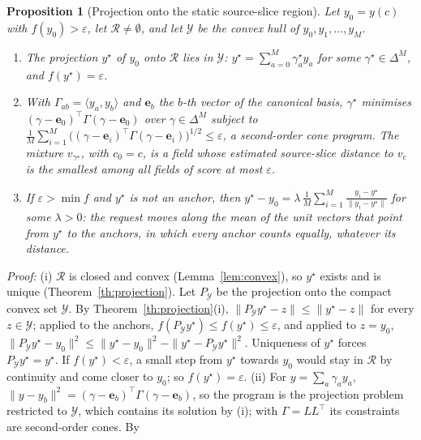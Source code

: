 \documentclass{article}
\theoremstyle{plain}
\newtheorem{proposition}[theorem]{Proposition}
\theoremstyle{remark}
\begin{document}
\begin{proposition}[Projection onto the static source-slice region]\label{pr:slice_projection}
Let $y_0=y(c)$ with $f(y_0)>\varepsilon$, let $\mathcal R\ne\emptyset$, and let $\mathcal Y$ be the convex hull of $y_0,y_1,\dots,y_M$.
\begin{enumerate}[label=(\roman*)]
\item The projection $y^\star$ of $y_0$ onto $\mathcal R$ lies in $\mathcal Y$: $y^\star=\sum_{a=0}^M\gamma^\star_ay_a$ for some $\gamma^\star\in\Delta^M$,
and $f(y^\star)=\varepsilon$.
\item With $\Gamma_{ab}=\langle y_a,y_b\rangle$ and $\mathbf e_b$ the $b$-th vector of the canonical basis, $\gamma^\star$ minimises
$(\gamma-\mathbf e_0)^\top\Gamma(\gamma-\mathbf e_0)$ over $\gamma\in\Delta^M$ subject to
$\frac1M\sum_{i=1}^M\big((\gamma-\mathbf e_i)^\top\Gamma(\gamma-\mathbf e_i)\big)^{1/2}\le\varepsilon$, a second-order cone program. The mixture
$v_{\gamma^\star}$, with $c_0=c$, is a field whose estimated source-slice distance to $v_c$ is the smallest among all fields of score at
most $\varepsilon$.
\item If $\varepsilon>\min f$ and $y^\star$ is not an anchor, then
$y^\star-y_0=\lambda\,\frac1M\sum_{i=1}^M\frac{y_i-y^\star}{\|y_i-y^\star\|}$ for some $\lambda>0$: the request moves along the mean of the
unit vectors that point from $y^\star$ to the anchors, in which every anchor counts equally, whatever its distance.
\end{enumerate}
\end{proposition}
\textit{Proof:}
(i) $\mathcal R$ is closed and convex (Lemma~\ref{lem:convex}), so $y^\star$ exists and is unique (Theorem~\ref{th:projection}). Let $P_{\mathcal Y}$ be the
projection onto the compact convex set $\mathcal Y$. By Theorem~\ref{th:projection}(i), $\|P_{\mathcal Y}y^\star-z\|\le\|y^\star-z\|$ for every
$z\in\mathcal Y$; applied to the anchors, $f(P_{\mathcal Y}y^\star)\le f(y^\star)\le\varepsilon$, and applied to $z=y_0$,
$\|P_{\mathcal Y}y^\star-y_0\|^2\le\|y^\star-y_0\|^2-\|y^\star-P_{\mathcal Y}y^\star\|^2$. Uniqueness of $y^\star$ forces $P_{\mathcal Y}y^\star=y^\star$. If
$f(y^\star)<\varepsilon$, a small step from $y^\star$ towards $y_0$ would stay in $\mathcal R$ by continuity and come closer to $y_0$; so
$f(y^\star)=\varepsilon$.
(ii) For $y=\sum_a\gamma_ay_a$, $\|y-y_b\|^2=(\gamma-\mathbf e_b)^\top\Gamma(\gamma-\mathbf e_b)$, so the program is the projection problem restricted
to $\mathcal Y$, which contains its solution by (i); with $\Gamma=LL^\top$ its constraints are second-order cones. By
\end{document}
